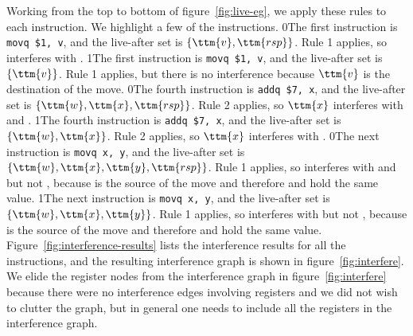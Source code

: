 \documentclass[7x10]{TimesAPriori_MIT}%
\def\racketEd{0}
\def\pythonEd{1}
\def\edition{1}
\newcommand{\racket}[1]{{\if\edition\racketEd{#1}\fi}}
\newcommand{\pythonColor}[0]{}
\newcommand{\python}[1]{{\if\edition\pythonEd\pythonColor #1\fi}}
\numberwithin{theorem}{chapter}
\numberwithin{definition}{chapter}
\numberwithin{equation}{chapter}
\begin{document}
Working from the top to bottom of figure~\ref{fig:live-eg}, we apply
these rules to each instruction. We highlight a few of the
instructions.  \racket{The first instruction is \lstinline{movq $1, v},
  and the live-after set is $\{\ttm{v},\ttm{rsp}\}$. Rule 1 applies,
  so \code{v} interferes with \code{rsp}.}
%
\python{The first instruction is \lstinline{movq $1, v}, and the
  live-after set is $\{\ttm{v}\}$. Rule 1 applies, but there is
  no interference because $\ttm{v}$ is the destination of the move.}
%
\racket{The fourth instruction is \lstinline{addq $7, x}, and the
  live-after set is $\{\ttm{w},\ttm{x},\ttm{rsp}\}$. Rule 2 applies, so
  $\ttm{x}$ interferes with  and \ttm{rsp}.}
%
\python{The fourth instruction is \lstinline{addq $7, x}, and the
  live-after set is $\{\ttm{w},\ttm{x}\}$. Rule 2 applies, so
  $$ interferes with .}
%
\racket{The next instruction is \lstinline{movq x, y}, and the
  live-after set is $\{\ttm{w},\ttm{x},\ttm{y},\ttm{rsp}\}$. Rule 1
  applies, so \ttm{y} interferes with \ttm{w} and \ttm{rsp} but not
  \ttm{x}, because \ttm{x} is the source of the move and therefore
   and  hold the same value.}
%
\python{The next instruction is \lstinline{movq x, y}, and the
  live-after set is $\{\ttm{w},\ttm{x},\ttm{y}\}$. Rule 1
  applies, so \ttm{y} interferes with \ttm{w} but not
  \ttm{x}, because \ttm{x} is the source of the move and therefore
  \ttm{x} and \ttm{y} hold the same value.}
%
Figure~\ref{fig:interference-results} lists the interference results
for all the instructions, and the resulting interference graph is
shown in figure~\ref{fig:interfere}. We elide the register nodes from
the interference graph in figure~\ref{fig:interfere} because there
were no interference edges involving registers and we did not wish to
clutter the graph, but in general one needs to include all the
registers in the interference graph.
\end{document}
